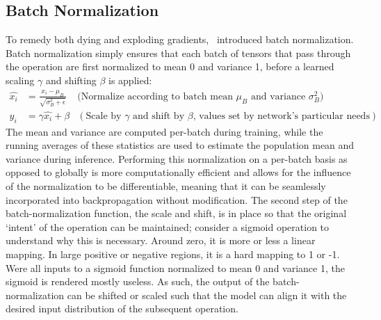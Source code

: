 \subsection{Batch Normalization} \label{sect:batch_norm}
To remedy both dying and exploding gradients,~\cite{ioffe2015} introduced batch normalization.
Batch normalization simply ensures that each batch of tensors
that pass through the operation are first normalized to mean 0 and variance 1, before a learned scaling $\gamma$ and shifting $\beta$ is applied:
\begin{align}
	\hat{x_i} &= \frac{x_i - \mu_{\mathit{B}}}{\sqrt{\sigma^2_\mathit{B} + \epsilon}} & \text{(Normalize according to batch mean } \mu_{\mathit{B}} \text{ and variance } \sigma^2_\mathit{B}) &\\
	y_i &= \gamma \hat{x_i} + \beta  &(\text{Scale by } \gamma \text{ and shift by } \beta\text{, values set by network's particular needs})
\end{align}
The mean and variance are computed per-batch during training, while the running averages of these statistics are
used to estimate the population mean and variance during inference. Performing this normalization on a per-batch basis
as opposed to globally is more computationally efficient and allows for the influence of the normalization to be
differentiable, meaning that it can be seamlessly incorporated into backpropagation without modification. The second step
of the batch-normalization function, the scale and shift, is in place so that the original
`intent' of the operation can be maintained; consider a sigmoid operation to understand why this is necessary.
Around zero, it is more or less a linear mapping. In large positive or negative regions, it is a hard mapping to 1 or -1.
Were all inputs to a sigmoid function normalized to mean 0 and variance 1, the sigmoid is rendered mostly useless. As such,
the output of the batch-normalization can be shifted or scaled such that the model can align it with the desired input
distribution of the subsequent operation.

